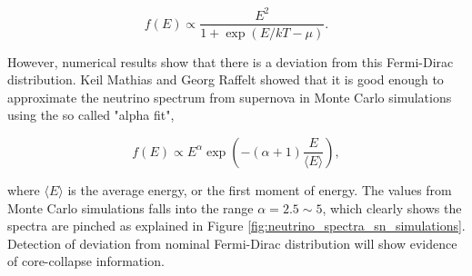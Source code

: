 \begin{equation}
f(E)\propto \frac{E^2}{1+\exp ( E/kT - \mu )}.
\end{equation}

However, numerical results show that there is a deviation from this Fermi-Dirac distribution.\cite{Totani1998,Keil2003} Keil Mathias and Georg Raffelt showed that it is good enough to approximate the neutrino spectrum from supernova in Monte Carlo simulations using the so called "alpha fit",

\begin{equation}
f(E)\propto E^\alpha \exp\left( -(\alpha+1)\frac{E}{\langle E\rangle} \right),
\end{equation}

where $\langle E\rangle$ is the average energy, or the first moment of energy. The values from Monte Carlo simulations falls into the range $\alpha = 2.5\sim 5$, which clearly shows the spectra are pinched as explained in Figure \ref{fig:neutrino_spectra_sn_simulations}. Detection of deviation from nominal Fermi-Dirac distribution will show evidence of core-collapse information.


